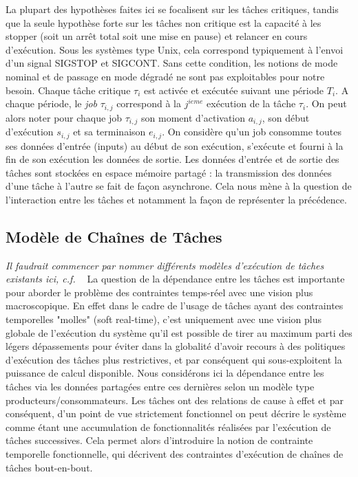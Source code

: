 \documentclass[french, a4paper, 11pt, twoside, pdftex]{StyleThese}
\begin{document}
    La plupart des hypothèses faites ici se focalisent sur les tâches critiques, tandis que la seule hypothèse forte sur les tâches non critique est la capacité à les stopper (soit un arrêt total soit une mise en pause) et relancer en cours d'exécution. Sous les systèmes type Unix, cela correspond typiquement à l'envoi d'un signal SIGSTOP et SIGCONT. Sans cette condition, les notions de mode nominal et de passage en mode dégradé ne sont pas exploitables pour notre besoin. 
    Chaque tâche critique $\tau_i$ est activée et exécutée suivant une période $T_i$. A chaque période, le \textit{job} $\tau_{i,j}$ correspond à la $j^{ieme}$ exécution de la tâche $\tau_i$. On peut alors noter pour chaque job $\tau_{i,j}$ son moment d'activation $a_{i,j}$, son début d'exécution $s_{i,j}$ et sa terminaison $e_{i,j}$. On considère qu'un job consomme toutes ses données d'entrée (inputs) au début de son exécution, s'exécute et fourni à la fin de son exécution les données de sortie. Les données d'entrée et de sortie des tâches sont stockées en espace mémoire partagé : la transmission des données d'une tâche à l'autre se fait de façon asynchrone.
    Cela nous mène à la question de l'interaction entre les tâches et notamment la façon de représenter la précédence.

    \subsection{Modèle de Chaînes de Tâches}
    
    \textit{Il faudrait commencer par nommer différents modèles d'exécution de tâches existants ici, c.f. ~\cite{friese_estimating_2018}}
    La question de la dépendance entre les tâches est importante pour aborder le problème des contraintes temps-réel avec une vision plus macroscopique. En effet dans le cadre de l'usage de tâches ayant des contraintes temporelles "molles" (soft real-time), c'est uniquement avec une vision plus globale de l'exécution du système qu'il est possible de tirer au maximum parti des légers dépassements pour éviter dans la globalité d'avoir recours à des politiques d'exécution des tâches plus restrictives, et par conséquent qui sous-exploitent la puissance de calcul disponible.
    Nous considérons ici la dépendance entre les tâches via les données partagées entre ces dernières selon un modèle type producteurs/consommateurs. Les tâches ont des relations de cause à effet et par conséquent, d'un point de vue strictement fonctionnel on peut décrire le système comme étant une accumulation de fonctionnalités réalisées par l'exécution de tâches successives. Cela permet alors d'introduire la notion de contrainte temporelle fonctionnelle, qui décrivent des contraintes d'exécution de chaînes de tâches bout-en-bout.
    
\end{document}
